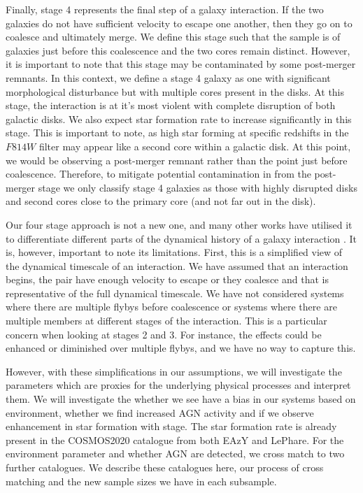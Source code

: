 \documentclass[fleqn,usenatbib]{mnras}
\begin{document}
Finally, stage 4 represents the final step of a galaxy interaction. If the two galaxies do not have sufficient velocity to escape one another, then they go on to coalesce and ultimately merge. We define this stage such that the sample is of galaxies just before this coalescence and the two cores remain distinct. However, it is important to note that this stage may be contaminated by some post-merger remnants. In this context, we define a stage 4 galaxy as one with significant morphological disturbance but with multiple cores present in the disks. At this stage, the interaction is at it's most violent with complete disruption of both galactic disks. We also expect star formation rate to increase significantly in this stage. This is important to note, as high star forming at specific redshifts in the $F814W$ filter may appear like a second core within a galactic disk. At this point, we would be observing a post-merger remnant rather than the point just before coalescence. Therefore, to mitigate potential contamination in from the post-merger stage we only classify stage 4 galaxies as those with highly disrupted disks and second cores close to the primary core (and not far out in the disk). 

Our four stage approach is not a new one, and many other works have utilised it to differentiate different parts of the dynamical history of a galaxy interaction \citep{}. It is, however, important to note its limitations. First, this is a simplified view of the dynamical timescale of an interaction. We have assumed that an interaction begins, the pair have enough velocity to escape or they coalesce and that is representative of the full dynamical timescale. We have not considered systems where there are multiple flybys before coalescence or systems where there are multiple members at different stages of the interaction. This is a particular concern when looking at stages 2 and 3. For instance, the effects could be enhanced or diminished over multiple flybys, and we have no way to capture this.

However, with these simplifications in our assumptions, we will investigate the parameters which are proxies for the underlying physical processes and interpret them. We will investigate the whether we see have a bias in our systems based on environment, whether we find increased AGN activity and if we observe enhancement in star formation with stage. The star formation rate is already present in the COSMOS2020 catalogue from both EAzY and LePhare. For the environment parameter and whether AGN are detected, we cross match to two further catalogues. We describe these catalogues here, our process of cross matching and the new sample sizes we have in each subsample.
\end{document}
